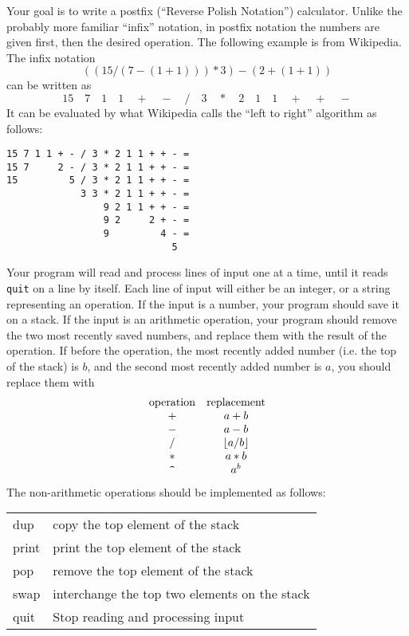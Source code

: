 
Your goal is to write a postfix (``Reverse Polish Notation'')
calculator.  Unlike the probably more familiar ``infix'' notation, in
postfix notation the numbers are given first, then the desired
operation.  The following example is from Wikipedia.  The infix
notation
\begin{displaymath}
((15 / (7 - (1 + 1))) * 3) - (2 + (1 + 1))  
\end{displaymath}
can be written as
\begin{displaymath}
15\quad{}7\quad{}1\quad{}1\quad{}+\quad{}-\quad{}/\quad{}3\quad{}*\quad{}2\quad{}1\quad{}1\quad{}+\quad{}+\quad{}-  
\end{displaymath}
It can be evaluated by what
Wikipedia calls the ``left to right'' algorithm as follows:

\begin{verbatim}
15 7 1 1 + - / 3 * 2 1 1 + + - =
15 7     2 - / 3 * 2 1 1 + + - =
15         5 / 3 * 2 1 1 + + - =
             3 3 * 2 1 1 + + - =
                 9 2 1 1 + + - =
                 9 2     2 + - =
                 9         4 - =
                             5
\end{verbatim}


Your program will read and process lines of input one at a time, until
it reads \texttt{quit} on a line by itself. Each line of input will either be
an integer, or a string representing an operation. If the input is a
number, your program should save it on a stack.  If the input is an
arithmetic operation, your program should remove the two most recently
saved numbers, and replace them with the result of the operation.  If
before the operation, the most recently added number (i.e. the top of
the stack) is $b$, and the second most recently added number is $a$,
you should replace them with
\begin{displaymath}
  \begin{array}{cc}
    \mathrm{operation} & \mathrm{replacement}\\
    + & a+b\\
    - & a-b\\
    / & \lfloor a / b \rfloor\\
    {}* & a*b\\
    {}\verb|^| & a^b
  \end{array}
\end{displaymath}
The non-arithmetic operations should be implemented as follows:
\begin{center}
\begin{tabular}{ll}
dup & copy the top element of the stack \\
print& print the top element of the stack \\
pop& remove the top element of the stack\\
swap& interchange the top two elements on the stack \\
quit& Stop reading and processing input\\
\end{tabular}
\end{center}


